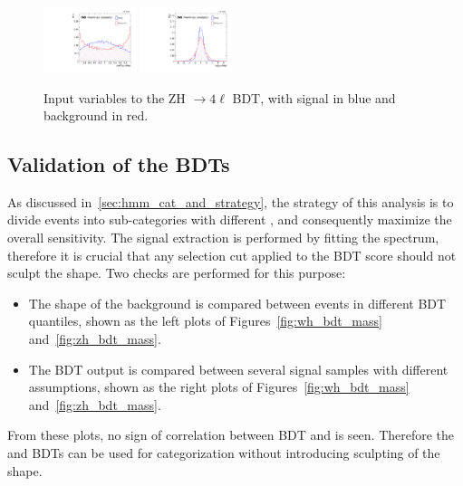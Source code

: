 \begin{figure}[!htb]
    \includegraphics[width=0.24\textwidth]{pics/VH_sec/BDT_train_ZH/BDT_cts_dipair_H.pdf}           
    \includegraphics[width=0.24\textwidth]{pics/VH_sec/BDT_train_ZH/BDT_dipair_dEta_H.pdf}

    \caption{Input variables to the ZH $\to 4\ell$ BDT, with signal in blue and background in red.}
    \label{fig:zh_bdt_vars}
\end{figure}


\clearpage
\subsection{Validation of the BDTs}\label{subsec:bdt_validation}

As discussed in~\ref{sec:hmm_cat_and_strategy}, the strategy of this analysis is to divide events into sub-categories with different \SoB,
and consequently maximize the overall sensitivity.
The signal extraction is performed by fitting the \mmm spectrum, therefore it is crucial that 
any selection cut applied to the BDT score should not sculpt the \mmm shape.
Two checks are performed for this purpose:
\begin{itemize}
	\item The \mmm shape of the background is compared between events in different BDT quantiles, shown as the left plots of Figures~\ref{fig:wh_bdt_mass} and~\ref{fig:zh_bdt_mass}. 
	\item The BDT output is compared between several signal samples with different \mh assumptions, shown as the right plots of Figures~\ref{fig:wh_bdt_mass} and~\ref{fig:zh_bdt_mass}.
\end{itemize}
From these plots, no sign of correlation between BDT and \mmm is seen. 
Therefore the \WH and \ZH BDTs can be used for categorization without introducing sculpting of the \mmm shape.

